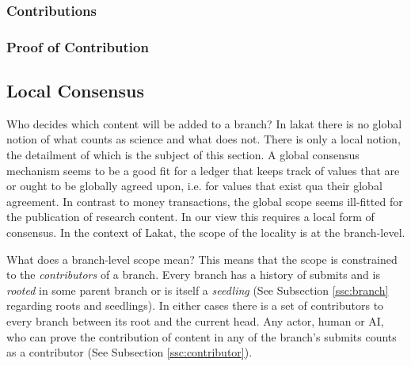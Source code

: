 \documentclass[14pt]{article}
\begin{document}
\subsubsection{Contributions}
\label{ssc:contributions}


\subsubsection{Proof of Contribution}
\label{ssc:proofofcontributions}


\subsection{Local Consensus}
\label{ssc:localconsensus}

Who decides which content will be added to a branch? In lakat there is no global notion of what counts as science and what does not. There is only a local notion, the detailment of which is the subject of this section. A global consensus mechanism seems to be a good fit for a ledger that keeps track of values that are or ought to be globally agreed upon, i.e. for values that exist qua their global agreement. In contrast to money transactions, the global scope seems ill-fitted for the publication of research content. In our view this requires a local form of consensus. In the context of Lakat, the scope of the locality is at the branch-level. 

What does a branch-level scope mean? This means that the scope is constrained to the \textit{contributors} of a branch. Every branch has a history of submits and is \textit{rooted} in some parent branch or is itself a \textit{seedling} (See Subsection \ref{ssc:branch} regarding roots and seedlings). In either cases there is a set of contributors to every branch between its root and the current head. Any actor, human or AI, who can prove the contribution of content in any of the branch's submits counts as a contributor (See Subsection \ref{ssc:contributor}). 
\end{document}
